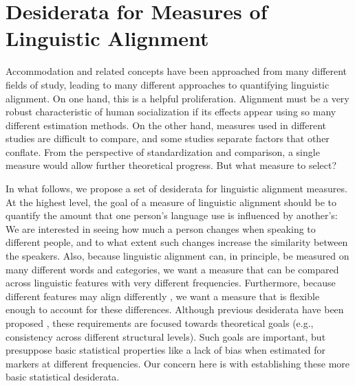 \documentclass{acm_proc_article-sp}
\begin{document}




\section{Desiderata for Measures of Linguistic Alignment }

Accommodation and related concepts have been approached from many different fields of study, leading to many different approaches to quantifying linguistic alignment. On one hand, this is a helpful proliferation. Alignment must be a very robust characteristic of human socialization if its effects appear using so many different estimation methods.  On the other hand, measures used in different studies are difficult to compare, and some studies separate factors that other conflate. From the perspective of standardization and comparison, a single measure would allow further theoretical progress. But what measure to select? 

In what follows, we propose a set of desiderata for linguistic alignment measures. At the highest level, the goal of a measure of linguistic alignment should be to quantify the amount that one person's language use is influenced by another's: We are interested in seeing how much a person changes when speaking to different people, and to what extent such changes increase the similarity between the speakers. Also, because linguistic alignment can, in principle, be measured on many different words and categories, we want a measure that can be compared across linguistic features with very different frequencies.  Furthermore, because different features may align differently \cite{BilousKrauss1988,Ferrara1991}, we want a measure that is flexible enough to account for these differences. Although previous desiderata have been proposed \cite{XuReitter2015}, these requirements are focused towards theoretical goals (e.g., consistency across different structural levels). Such goals are important, but presuppose basic statistical properties like a lack of bias when estimated for markers at different frequencies. Our concern here is with establishing these more basic statistical desiderata. 
\end{document}
